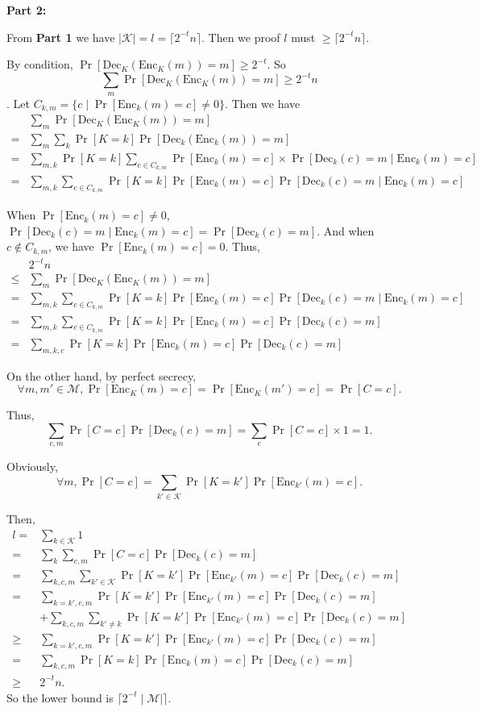 \documentclass[12pt]{article}
\newcommand{\K}{\mathcal{K}}
\newcommand{\M}{\mathcal{M}}
\newcommand{\Enc}{\text{Enc}}
\newcommand{\Dec}{\text{Dec}}
\newenvironment{problem}[2][Problem]{\begin{trivlist}
\item[\hskip \labelsep {\bfseries #1}\hskip \labelsep {\bfseries #2.}]}{\end{trivlist}}
\begin{document}
\begin{problem}{2.11}
    \textbf{Part 2:}\par
    From \textbf{Part 1} we have $\mid\K\mid=l=\lceil2^{-t}n\rceil$. Then we proof $l$ must $\ge \lceil2^{-t}n\rceil$.\par
    By condition, $\Pr[\Dec_K(\Enc_K(m))=m]\ge 2^{-t}$. So $$\sum_m\Pr[\Dec_K(\Enc_K(m))=m]\ge 2^{-t}n$$.
    Let $C_{k,m}=\{c\mid \Pr[\Enc_k(m)=c]\ne 0\}$. Then we have \begin{align*}
        &\sum_m\Pr[\Dec_K(\Enc_K(m))=m]\\
        =&\sum_m\sum_k\Pr[K=k]\Pr[\Dec_k(\Enc_k(m))=m]\\
        =&\sum_{m,k}\Pr[K=k]\sum_{c\in C_{k,m}}\Pr[\Enc_k(m)=c]\times\Pr[\Dec_k(c)=m\mid \Enc_k(m)=c]\\
        =&\sum_{m,k}\sum_{c\in C_{k,m}}\Pr[K=k]\Pr[\Enc_k(m)=c]\Pr[\Dec_k(c)=m\mid \Enc_k(m)=c]
    \end{align*}\par
    When $\Pr[\Enc_k(m)=c]\ne0$, $\Pr[\Dec_k(c)=m\mid \Enc_k(m)=c]=\Pr[\Dec_k(c)=m]$. And when $c\not\in C_{k,m}$, we have $\Pr[\Enc_k(m)=c]=0$. Thus,
    \begin{align*}
    &2^{-t}n\\
    \le&\sum_m\Pr[\Dec_K(\Enc_K(m))=m]\\
    =&\sum_{m,k}\sum_{c\in C_{k,m}}\Pr[K=k]\Pr[\Enc_k(m)=c]\Pr[\Dec_k(c)=m\mid \Enc_k(m)=c]\\
    =&\sum_{m,k}\sum_{c\in C_{k,m}}\Pr[K=k]\Pr[\Enc_k(m)=c]\Pr[\Dec_k(c)=m]\\
    =&\sum_{m,k,c}\Pr[K=k]\Pr[\Enc_k(m)=c]\Pr[\Dec_k(c)=m]
    \end{align*}\par
    On the other hand, by perfect secrecy, $$\forall m,m'\in\M,\Pr[\Enc_K(m)=c]=\Pr[\Enc_K(m')=c]=\Pr[C=c].$$\par
    Thus, $$\sum_{c,m}\Pr[C=c]\Pr[\Dec_k(c)=m]=\sum_{c}\Pr[C=c]\times1=1.$$ \par
    Obviously, $$\forall m,\Pr[C=c]=\sum_{k'\in\K}\Pr[K=k']\Pr[\Enc_{k'}(m)=c].$$\par Then,
    \begin{align*}
        l=&\sum_{k\in\K}1\\
        =&\sum_{k}\sum_{c,m}\Pr[C=c]\Pr[\Dec_k(c)=m]\\
        =&\sum_{k,c,m}\sum_{k'\in\K}\Pr[K=k']\Pr[\Enc_{k'}(m)=c]\Pr[\Dec_k(c)=m]\\
        =&\sum_{k=k',c,m}\Pr[K=k']\Pr[\Enc_{k'}(m)=c]\Pr[\Dec_k(c)=m]\\
        &+\sum_{k,c,m}\sum_{k'\ne k}\Pr[K=k']\Pr[\Enc_{k'}(m)=c]\Pr[\Dec_k(c)=m]\\
        \ge&\sum_{k=k',c,m}\Pr[K=k']\Pr[\Enc_{k'}(m)=c]\Pr[\Dec_k(c)=m]\\
        =&\sum_{k,c,m}\Pr[K=k]\Pr[\Enc_{k}(m)=c]\Pr[\Dec_k(c)=m]\\
        \ge&2^{-t}n.
    \end{align*}
    So the lower bound is $\lceil2^{-t}\mid\M\mid\rceil$.
\end{problem}
\end{document}
